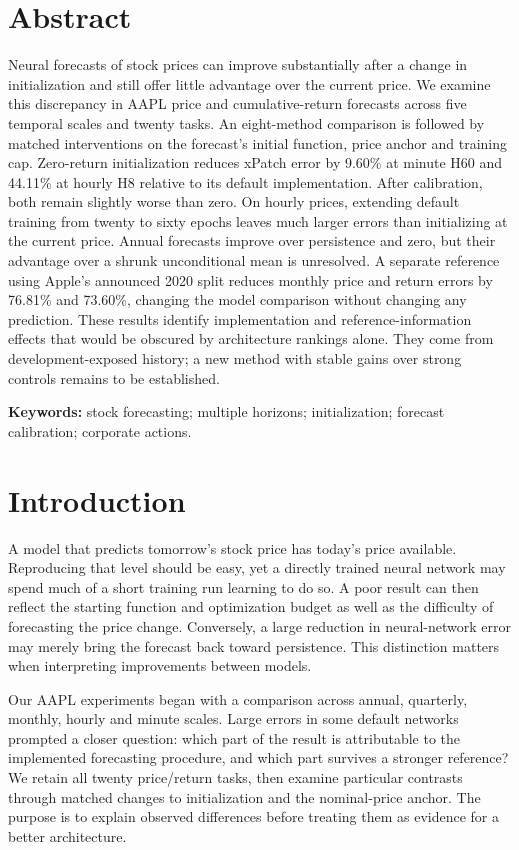 \section*{Abstract}
Neural forecasts of stock prices can improve substantially after a change in initialization and still offer little advantage over the current price. We examine this discrepancy in AAPL price and cumulative-return forecasts across five temporal scales and twenty tasks. An eight-method comparison is followed by matched interventions on the forecast's initial function, price anchor and training cap. Zero-return initialization reduces xPatch error by 9.60\% at minute H60 and 44.11\% at hourly H8 relative to its default implementation. After calibration, both remain slightly worse than zero. On hourly prices, extending default training from twenty to sixty epochs leaves much larger errors than initializing at the current price. Annual forecasts improve over persistence and zero, but their advantage over a shrunk unconditional mean is unresolved. A separate reference using Apple's announced 2020 split reduces monthly price and return errors by 76.81\% and 73.60\%, changing the model comparison without changing any prediction. These results identify implementation and reference-information effects that would be obscured by architecture rankings alone. They come from development-exposed history; a new method with stable gains over strong controls remains to be established.

\noindent\textbf{Keywords:} stock forecasting; multiple horizons; initialization; forecast calibration; corporate actions.

\section{Introduction}\label{sec:introduction}

A model that predicts tomorrow's stock price has today's price available. Reproducing that level should be easy, yet a directly trained neural network may spend much of a short training run learning to do so. A poor result can then reflect the starting function and optimization budget as well as the difficulty of forecasting the price change. Conversely, a large reduction in neural-network error may merely bring the forecast back toward persistence. This distinction matters when interpreting improvements between models.

Our AAPL experiments began with a comparison across annual, quarterly, monthly, hourly and minute scales. Large errors in some default networks prompted a closer question: which part of the result is attributable to the implemented forecasting procedure, and which part survives a stronger reference? We retain all twenty price/return tasks, then examine particular contrasts through matched changes to initialization and the nominal-price anchor. The purpose is to explain observed differences before treating them as evidence for a better architecture.

